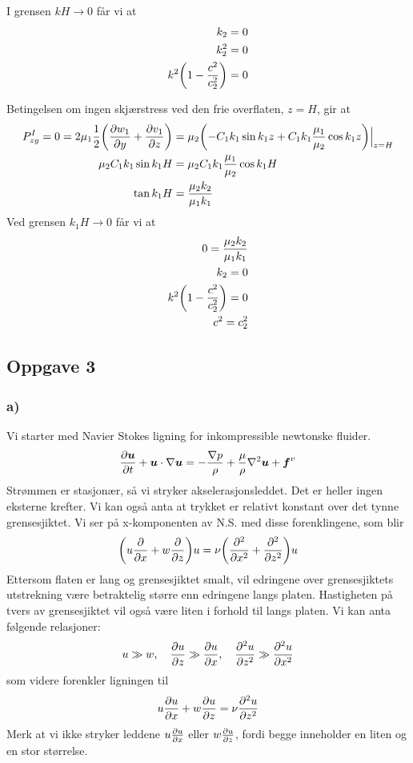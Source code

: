 \documentclass[12p,a4paper]{article}
\renewcommand{\b}{\boldsymbol}
\newcommand{\half}{\frac{1}{2}}
\begin{document}
I grensen $kH \rightarrow 0$ får vi at
\begin{align*}
    k_2 = 0 \\
    k_2^2 = 0 \\
    k^2\qty(1-\frac{c^2}{c_2^2}) = 0
\end{align*}

Betingelsen om ingen skjærstress ved den frie overflaten, $z=H$, gir at
\begin{align*}
    P_{zy}^I = 0 = 2\mu_1\half\qty(\pdv{w_1}{y}+\pdv{v_1}{z}) &= \mu_2\qty(-C_1k_1\sin{k_1z} + C_1k_1\frac{\mu_1}{\mu_2}\cos{k_1z}) \Big|_{z=H} \\
    \mu_2C_1k_1\sin{k_1H} &= \mu_2C_1k_1\frac{\mu_1}{\mu_2}\cos{k_1H} \\
    \tan{k_1H} &= \frac{\mu_2k_2}{\mu_1k_1}
\end{align*}
Ved grensen $k_1H \rightarrow 0$ får vi at
\begin{align*}
    0 = \frac{\mu_2k_2}{\mu_1k_1} \\
    k_2 = 0 \\
    k^2\qty(1 - \frac{c^2}{c_2^2}) = 0 \\
    c^2 = c_2^2
\end{align*}



\subsection*{Oppgave 3}
\subsubsection*{a)}
Vi starter med Navier Stokes ligning for inkompressible newtonske fluider.
\begin{align*}
    \pdv{\b u}{t} + \b u\cdot\nabla\b u =-\frac{\nabla p}{\rho} + \frac{\mu}{\rho}\nabla^2\b u + \b f^v
\end{align*}
Strømmen er stasjonær, så vi stryker akselerasjonsleddet. Det er heller ingen eksterne krefter. Vi kan også anta at trykket er relativt konstant over det tynne grensesjiktet. Vi ser på x-komponenten av N.S. med disse forenklingene, som blir
\begin{align*}
    \qty(u\pdv{x} + w\pdv{z})u = \nu\qty(\pdv[2]{x} + \pdv[2]{z})u
\end{align*}
Ettersom flaten er lang og grensesjiktet smalt, vil edringene over grensesjiktets utstrekning være betraktelig større enn edringene langs platen. Hastigheten på tvers av grensesjiktet vil også være liten i forhold til langs platen. Vi kan anta følgende relasjoner:
\begin{align*}
    u \gg w,\quad \pdv{u}{z} \gg \pdv{u}{x},\quad \pdv[2]{u}{z} \gg \pdv[2]{u}{x}
\end{align*}
som videre forenkler ligningen til
\begin{align}\label{eqn:1}
    u\pdv{u}{x} + w\pdv{u}{z} = \nu \pdv[2]{u}{z}
\end{align}
Merk at vi ikke stryker leddene $u\pdv{u}{x}$ eller $w\pdv{u}{z}$, fordi begge inneholder en liten og en stor størrelse.
\end{document}
